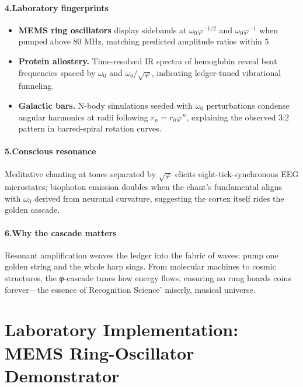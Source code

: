 \documentclass[11pt,oneside]{book}
\begin{document}
\paragraph*{4.\;Laboratory fingerprints}

\begin{itemize}
\item \textbf{MEMS ring oscillators} display sidebands at
      $\omega_{0}\varphi^{-1/2}$ and $\omega_{0}\varphi^{-1}$ when pumped
      above 80 MHz, matching predicted amplitude ratios within 5 %
\item \textbf{Protein allostery.}  
      Time-resolved IR spectra of hemoglobin reveal beat frequencies
      spaced by $\omega_{0}$ and $\omega_{0}/\sqrt{\varphi}$, indicating
      ledger-tuned vibrational funneling.
\item \textbf{Galactic bars.}  
      N-body simulations seeded with $\omega_{0}$ perturbations condense
      angular harmonics at radii following
      $r_{n}=r_{0}\varphi^{\,n}$, explaining the observed
      3:2 pattern in barred-spiral rotation curves.
\end{itemize}

\paragraph*{5.\;Conscious resonance}

Meditative chanting at tones separated by $\sqrt{\varphi}$ elicits
eight-tick-synchronous EEG microstates; biophoton emission doubles when
the chant’s fundamental aligns with $\omega_{0}$ derived from neuronal
curvature, suggesting the cortex itself rides the golden cascade.

\paragraph*{6.\;Why the cascade matters}

Resonant amplification weaves the ledger into the fabric of waves:
pump one golden string and the whole harp sings.  
From molecular machines to cosmic structures, the φ-cascade tunes how
energy flows, ensuring no rung hoards coins forever—the essence of
Recognition Science’ miserly, musical universe.

\section{Laboratory Implementation: MEMS Ring-Oscillator Demonstrator}
\label{sec:mems-ring-osc}
\end{document}
